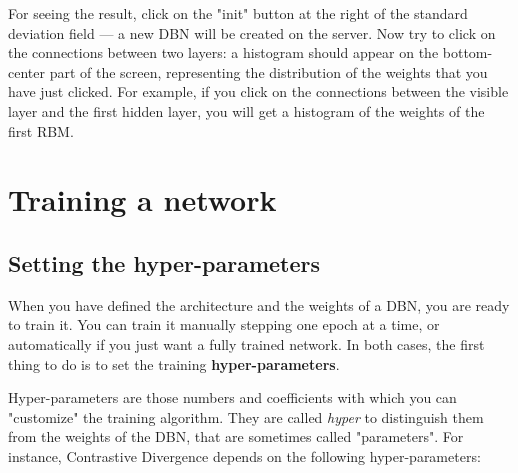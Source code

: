\documentclass[a4paper]{article}
\begin{document}
For seeing the result, click on the "init" button at the right of the standard deviation field --- a new DBN will be created on the server. Now try to click on the connections between two layers: a histogram should appear on the bottom-center part of the screen, representing the distribution of the weights that you have just clicked. For example, if you click on the connections between the visible layer and the first hidden layer, you will get a histogram of the weights of the first RBM.
	


		
	\section{Training a network}


		
	\subsection{Setting the hyper-parameters}

		
When you have defined the architecture and the weights of a DBN, you are ready to train it. You can train it manually stepping one epoch at a time, or automatically if you just want a fully trained network. In both cases, the first thing to do is to set the training \textbf{hyper-parameters}.
		
Hyper-parameters are those numbers and coefficients with which you can "customize" the training algorithm. They are called \emph{hyper} to distinguish them from the weights of the DBN, that are sometimes called "parameters". For instance, Contrastive Divergence depends on the following hyper-parameters:
		
\end{document}
